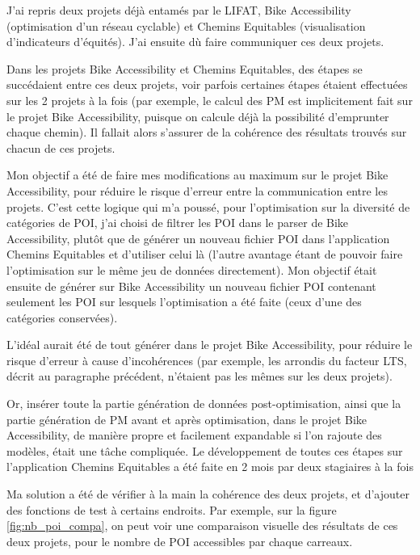 J'ai repris deux projets déjà entamés par le LIFAT, Bike Accessibility (optimisation d'un réseau cyclable) et Chemins Equitables (visualisation d'indicateurs d'équités). J'ai ensuite dù faire communiquer ces deux projets. 

Dans les projets Bike Accessibility et Chemins Equitables, des étapes se succédaient entre ces deux projets, voir parfois certaines étapes étaient effectuées sur les 2 projets à la fois (par exemple, le calcul des PM est implicitement fait sur le projet Bike Accessibility, puisque on calcule déjà la possibilité d'emprunter chaque chemin). Il fallait alors s'assurer de la cohérence des résultats trouvés sur chacun de ces projets. 

Mon objectif a été de faire mes modifications au maximum sur le projet Bike Accessibility, pour réduire le risque d'erreur entre la communication entre les projets. C'est cette logique qui m'a poussé, pour l'optimisation sur la diversité de catégories de POI, j'ai choisi de filtrer les POI dans le parser de Bike Accessibility, plutôt que de générer un nouveau fichier POI dans l'application Chemins Equitables et d'utiliser celui là (l'autre avantage étant de pouvoir faire l'optimisation sur le même jeu de données directement). Mon objectif était ensuite de générer sur Bike Accessibility un nouveau fichier POI contenant seulement les POI sur lesquels l'optimisation a été faite (ceux d'une des catégories conservées).

L'idéal aurait été de tout générer dans le projet Bike Accessibility, pour réduire le risque d'erreur à cause d'incohérences (par exemple, les arrondis du facteur LTS, décrit au paragraphe précédent, n'étaient pas les mêmes sur les deux projets).

Or, insérer toute la partie génération de données post-optimisation, ainsi que la partie génération de PM avant et après optimisation, dans le projet Bike Accessibility, de manière propre et facilement expandable si l'on rajoute des modèles, était une tâche compliquée. Le développement de toutes ces étapes sur l'application Chemins Equitables a été faite en 2 mois par deux stagiaires à la fois

Ma solution a été de vérifier à la main la cohérence des deux projets, et d'ajouter des fonctions de test à certains endroits. Par exemple, sur la figure \ref{fig:nb_poi_compa}, on peut voir une comparaison visuelle des résultats de ces deux projets, pour le nombre de POI accessibles par chaque carreaux.

